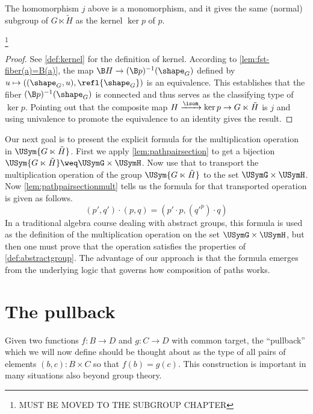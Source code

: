 \begin{lemma}
  The homomorphism $j$ above is a monomorphism, and it gives the same (normal) subgroup of $G \ltimes \tilde H$ as the kernel $\ker p$ of $p$.
\end{lemma}
\footnote{{\color{red}MUST BE MOVED TO THE SUBGROUP CHAPTER}}

\begin{proof}
  See \ref{def:kernel} for the definition of kernel.  According to \cref{lem:fst-fiber(a)=B(a)}, the map $\B H \to (\B p)^{-1}(\shape_G)$ defined by
  $ u \mapsto ((\shape_G,u), \refl{\shape_G}) $ is an equivalence.  This establishes that the fiber $(\B p)^{-1}(\shape_G)$ is connected and thus serves as
  the classifying type of $\ker p$.  Pointing out that the composite map $H \xrightarrow{\isom} \ker p \to G \ltimes \tilde H$ is $j$ and using
  univalence to promote the equivalence to an identity gives the result.
\end{proof}

Our next goal is to present the explicit formula for the multiplication operation in $\USym { G \ltimes \tilde H }$.
First we apply \cref{lem:pathpairsection} to get a bijection $\USym { G \ltimes \tilde H } \weq \USymG \times \USymH$.
Now use that to transport the multiplication operation of the group $\USym { G \ltimes \tilde H }$ to the set $\USymG \times \USymH$.
Now \cref{lem:pathpairsectionmult} tells us the formula for that transported operation is given as follows.
$$ (p',q') \cdot (p,q) = (p' \cdot p , ({q'} ^ p) \cdot q) $$
In a traditional algebra course dealing with abstract groups, this formula is used as the definition of the multiplication operation
on the set $\USymG \times \USymH$, but then one must prove that the operation satisfies the properties of \cref{def:abstractgroup}.
The advantage of our approach is that the formula emerges from the underlying logic that governs how composition of paths works.


\section{The pullback}
\label{sec:pullback}
Given two functions $f:B\to D$ and $g:C\to D$ with common target, the ``pullback'' which we will now define should be thought about as the type of all pairs of elements $(b,c):B\times C$ so that $f(b)=g(c)$.  This construction is important in many situations also beyond group theory.

